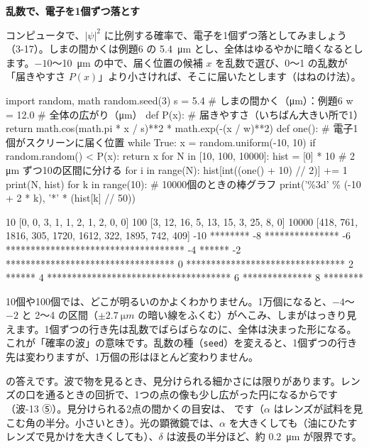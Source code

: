 \noindent\textbf{乱数で、電子を1個ずつ落とす}\par\nobreak
コンピュータで、$|\psi|^2$ に比例する確率で、電子を1個ずつ落としてみましょう（3-17）。しまの間かくは例題6 の \qty{5.4}{\micro m} とし、全体はゆるやかに暗くなるとします。$-10$〜\qty{10}{\micro m} の中で、届く位置の候補 $x$ を乱数で選び、0〜1 の乱数が「届きやすさ $P(x)$」より小さければ、そこに届いたとします（はねのけ法）。
\begin{phcode}[Python]
import random, math
random.seed(3)
s = 5.4          \# しまの間かく（\si{\micro m}）：例題6
w = 12.0         \# 全体の広がり（\si{\micro m}）
def P(x):        \# 届きやすさ（いちばん大きい所で1）
    return math.cos(math.pi * x / s)**2 * math.exp(-(x / w)**2)
def one():       \# 電子1個がスクリーンに届く位置
    while True:
        x = random.uniform(-10, 10)
        if random.random() < P(x):
            return x
for N in [10, 100, 10000]:
    hist = [0] * 10     \# 2 \si{\micro m} ずつ10の区間に分ける
    for i in range(N):
        hist[int((one() + 10) // 2)] += 1
    print(N, hist)
for k in range(10):     \# 10000個のときの棒グラフ
    print('\%3d' \% (-10 + 2 * k), '*' * (hist[k] // 50))
\end{phcode}
\begin{phcodeout}[実行結果]
10 [0, 0, 3, 1, 1, 2, 1, 2, 0, 0]
100 [3, 12, 16, 5, 13, 15, 3, 25, 8, 0]
10000 [418, 761, 1816, 305, 1720, 1612, 322, 1895, 742, 409]
-10 ********
 -8 ***************
 -6 ************************************
 -4 ******
 -2 **********************************
  0 ********************************
  2 ******
  4 *************************************
  6 **************
  8 ********
\end{phcodeout}
10個や100個では、どこが明るいのかよくわかりません。1万個になると、$-4$〜$-2$ と 2〜4 の区間（$\pm\qty{2.7}{\micro m}$ の暗い線をふくむ）がへこみ、しまがはっきり見えます。1個ずつの行き先は乱数でばらばらなのに、全体は決まった形になる。これが「確率の波」の意味です。乱数の種（\texttt{seed}）を変えると、1個ずつの行き先は変わりますが、1万個の形はほとんど変わりません。

\label{ph:原-3:sec6}
\label{ph:原-3:hatena}\bkhatenaref の答えです。波で物を見るとき、見分けられる細かさには限りがあります。レンズの口を通るときの回折で、1つの点の像も少し広がった円になるからです（波-13 ⑤）。見分けられる2点の間かくの目安は、
です（$\alpha$ はレンズが試料を見こむ角の半分。小さいとき）。光の顕微鏡では、$\alpha$ を大きくしても（油にひたすレンズで見かけを大きくしても）、$\delta$ は波長の半分ほど、約 \qty{0.2}{\micro m} が限界です。

